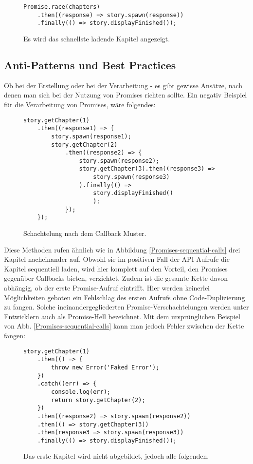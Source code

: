 \begin{figure}[H]
\begin{lstlisting}[basicstyle=\small]
Promise.race(chapters)
    .then((response) => story.spawn(response))
    .finally(() => story.displayFinished());
\end{lstlisting}
\caption{Es wird das schnellste ladende Kapitel angezeigt.}
\end{figure}

\subsection{Anti-Patterns und Best Practices}

Ob bei der Erstellung oder bei der Verarbeitung - es gibt gewisse Ansätze, nach denen man sich bei der Nutzung von Promises richten sollte. Ein negativ Beispiel für die Verarbeitung von Promises, wäre folgendes:

\begin{figure}[H]
\begin{lstlisting}[basicstyle=\small]
story.getChapter(1)
    .then((response1) => {
        story.spawn(response1);
        story.getChapter(2)
            .then((response2) => {
                story.spawn(response2);
                story.getChapter(3).then((response3) =>
                    story.spawn(response3)
                ).finally(() => 
                    story.displayFinished()
                    );
            });
    });
\end{lstlisting}
\caption{Schachtelung nach dem Callback Muster.}
\end{figure}

\noindent
Diese Methoden rufen ähnlich wie in Abbildung \ref{Promises-sequential-calls} drei Kapitel nacheinander auf. Obwohl sie im positiven Fall der API-Aufrufe die Kapitel sequentiell laden, wird hier komplett auf den Vorteil, den Promises gegenüber Callbacks bieten, verzichtet. Zudem ist die gesamte Kette davon abhängig, ob der erste Promise-Aufruf eintrifft. Hier werden keinerlei Möglichkeiten geboten ein Fehlschlag des ersten Aufrufs ohne Code-Duplizierung zu fangen. Solche ineinandergegliederten Promise-Verschachtelungen werden unter Entwicklern auch als \glqq{}Promise-Hell\grqq{} bezeichnet.
Mit dem ursprünglichen Beispiel von Abb. \ref{Promises-sequential-calls} kann man jedoch Fehler zwischen der Kette fangen:

\begin{figure}[H]
\begin{lstlisting}[basicstyle=\small]
story.getChapter(1)
    .then(() => {
        throw new Error('Faked Error');
    })
    .catch((err) => {
        console.log(err);
        return story.getChapter(2);
    })
    .then((response2) => story.spawn(response2))
    .then(() => story.getChapter(3))
    .then(response3 => story.spawn(response3))
    .finally(() => story.displayFinished());
\end{lstlisting}
\caption{Das erste Kapitel wird nicht abgebildet, jedoch alle folgenden.}
\end{figure}

